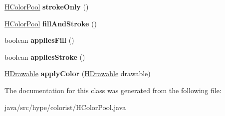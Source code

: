 \begin{DoxyCompactItemize}
\item 
\hypertarget{classhype_1_1colorist_1_1_h_color_pool_a642aa9b2b99cb0c71eebfe358c8b8b44}{\hyperlink{classhype_1_1colorist_1_1_h_color_pool}{H\-Color\-Pool} {\bfseries stroke\-Only} ()}\label{classhype_1_1colorist_1_1_h_color_pool_a642aa9b2b99cb0c71eebfe358c8b8b44}

\item 
\hypertarget{classhype_1_1colorist_1_1_h_color_pool_aad7efb3fc0ec69eafeef4356aeb84351}{\hyperlink{classhype_1_1colorist_1_1_h_color_pool}{H\-Color\-Pool} {\bfseries fill\-And\-Stroke} ()}\label{classhype_1_1colorist_1_1_h_color_pool_aad7efb3fc0ec69eafeef4356aeb84351}

\item 
\hypertarget{classhype_1_1colorist_1_1_h_color_pool_abd17ba965c794d176b3b1c463f362679}{boolean {\bfseries applies\-Fill} ()}\label{classhype_1_1colorist_1_1_h_color_pool_abd17ba965c794d176b3b1c463f362679}

\item 
\hypertarget{classhype_1_1colorist_1_1_h_color_pool_ae982edea259c2e0d6132b000116c1201}{boolean {\bfseries applies\-Stroke} ()}\label{classhype_1_1colorist_1_1_h_color_pool_ae982edea259c2e0d6132b000116c1201}

\item 
\hypertarget{classhype_1_1colorist_1_1_h_color_pool_aed067651aacc655889e86d2776f48a49}{\hyperlink{classhype_1_1drawable_1_1_h_drawable}{H\-Drawable} {\bfseries apply\-Color} (\hyperlink{classhype_1_1drawable_1_1_h_drawable}{H\-Drawable} drawable)}\label{classhype_1_1colorist_1_1_h_color_pool_aed067651aacc655889e86d2776f48a49}

\end{DoxyCompactItemize}


The documentation for this class was generated from the following file\-:\begin{DoxyCompactItemize}
\item 
java/src/hype/colorist/H\-Color\-Pool.\-java\end{DoxyCompactItemize}
